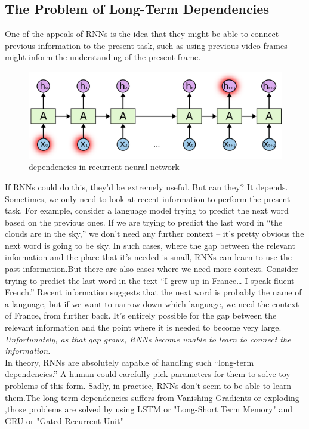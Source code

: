 \subsection{The Problem of Long-Term Dependencies}
\indent One of the appeals of RNNs is the idea that they might be able to connect previous information to the present task, such as using previous video frames might inform the understanding of the present frame.\\
 \begin{figure}[H]%
    \center%
    \includegraphics[width=\textwidth]{images/amir/RNN-longtermdependencies.png}%
    \caption[This is RNN net-dep image]{dependencies in recurrent neural network}\label{fig:RNN network-dep}%
  \end{figure}
  \indent If RNNs could do this, they’d be extremely useful. But can they? It depends.
Sometimes, we only need to look at recent information to perform the present task. For example, consider a language model trying to predict the next word based on the previous ones. If we are trying to predict the last word in “the clouds are in the sky,” we don’t need any further context – it’s pretty obvious the next word is going to be sky. In such cases, where the gap between the relevant information and the place that it’s needed is small, RNNs can learn to use the past information.But there are also cases where we need more context. Consider trying to predict the last word in the text “I grew up in France… I speak fluent French.” Recent information suggests that the next word is probably the name of a language, but if we want to narrow down which language, we need the context of France, from further back. It’s entirely possible for the gap between the relevant information and the point where it is needed to become very large.
\textit{Unfortunately, as that gap grows, RNNs become unable to learn to connect the information.}\\
\indent In theory, RNNs are absolutely capable of handling such “long-term dependencies.” A human could carefully pick parameters for them to solve toy problems of this form. Sadly, in practice, RNNs don’t seem to be able to learn them.The long term dependencies suffers from Vanishing Gradients or exploding ,those problems are solved by using LSTM or "Long-Short Term Memory" and GRU or "Gated Recurrent Unit"
